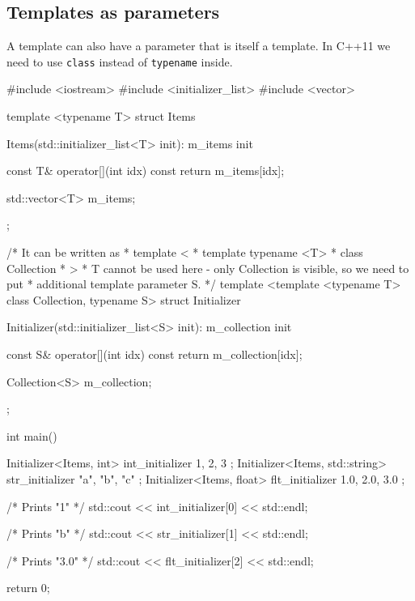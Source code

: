 \documentclass[../main]{subfiles}
\begin{document}
\subsection{Templates as parameters}
    A template can also have a parameter that is itself a template. In C++11 we need to use \texttt{class} instead of \texttt{typename} inside.
\begin{Code}
    #include <iostream>
    #include <initializer_list>
    #include <vector>
    
    template <typename T>
    struct Items
    {
        Items(std::initializer_list<T> init): m_items { init }
        {
        }
        
        const T& operator[](int idx) const
        {
            return m_items[idx];
        }
        
        std::vector<T> m_items;
    };
    
    /* It can be written as
     * template <
     *     template typename <T>
     *     class Collection
     *  >
     * T cannot be used here - only Collection is visible, so we need to put
     * additional template parameter S.
     */
    template <template <typename T> class Collection, typename S>
    struct Initializer
    {
        Initializer(std::initializer_list<S> init): m_collection { init }
        {
        }
        
        const S& operator[](int idx) const
        {
            return m_collection[idx];
        }
        
        Collection<S> m_collection;
    };
    
    int main()
    {
        Initializer<Items, int> int_initializer { 1, 2, 3 };
        Initializer<Items, std::string> str_initializer { "a", "b", "c" };
        Initializer<Items, float> flt_initializer { 1.0, 2.0, 3.0 };

        /* Prints "1" */
        std::cout << int_initializer[0] << std::endl;

        /* Prints "b" */
        std::cout << str_initializer[1] << std::endl;

        /* Prints "3.0" */
        std::cout << flt_initializer[2] << std::endl;
    
        return 0;
    }
\end{Code}
\end{document}
